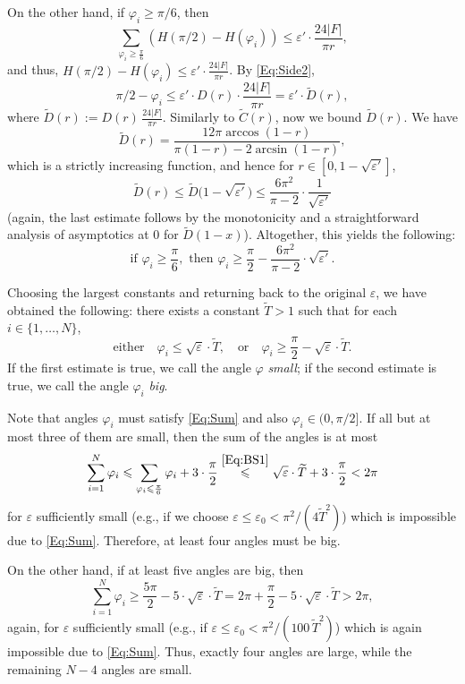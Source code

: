 \documentclass[11pt, oneside]{amsart}
\renewcommand{\tilde}{\widetilde}
\renewcommand{\phi}{\varphi}
\newcommand{\eps}{\varepsilon}
\renewcommand{\ge}{\geqslant}
\renewcommand{\le}{\leqslant}
\theoremstyle{theorem}
\theoremstyle{Intro}
\theoremstyle{definition}
\theoremstyle{remark}
\theoremstyle{claim}
\numberwithin{equation}{section}
\begin{document}
On the other hand, if $\phi_i \ge \pi/6$, then 
\[
\sum_{\phi_i \ge \frac{\pi}6}  (H(\pi/2) - H(\phi_i)) \le \eps' \cdot \frac{24 |F|}{\pi r},
\]
and thus, $H(\pi/2) - H(\phi_i) \le \eps' \cdot \frac{24 |F|}{\pi r}$. By \eqref{Eq:Side2},
\[
\pi/2 - \phi_i \le \eps' \cdot D(r) \cdot \frac{24 |F|}{\pi r} = \eps' \cdot \tilde D(r), 
\]
where $ \tilde D(r) := D(r) \, \frac{24 |F|}{\pi r}$. Similarly to $\tilde C(r)$, now we bound $\tilde D(r)$. We have
\[
\tilde D(r) = \frac{12\pi \arccos(1-r)}{\pi(1 - r) - 2\arcsin(1-r)},
\]
which is a strictly increasing function, and hence for $r \in [0, 1-\sqrt{\eps'}]$,
\[
\tilde D(r) \le \tilde D\big(1-\sqrt{\eps'}\big) \le \frac{6\pi^2}{\pi - 2} \cdot \frac{1}{\sqrt{\eps'}}
\]
(again, the last estimate follows by the monotonicity and a straightforward analysis of asymptotics at $0$ for $\tilde D(1-x)$). Altogether, this yields the following:
\begin{equation}
\label{Eq:BS2}
\text{if }\phi_i \ge \frac{\pi}{6}, \text{ then }\phi_i \ge \frac{\pi}{2} - \frac{6\pi^2}{\pi - 2} \cdot \sqrt{\eps'}.
\end{equation}

Choosing the largest constants and returning back to the original $\eps$, we have obtained the following: there exists a constant $\tilde T > 1$ such that for each $i \in \{1, \ldots, N\}$,
\[
\text{either}\quad \phi_i \le \sqrt{\eps} \cdot \tilde T, \quad \text{or} \quad\phi_i \ge \frac{\pi}{2} - \sqrt{\eps} \cdot \tilde T.
\]
If the first estimate is true, we call the angle $\phi$ \emph{small}; if the second estimate is true, we call the angle $\phi_i$ \emph{big}.


Note that angles $\phi_i$ must satisfy \eqref{Eq:Sum} and also $\phi_i \in (0, \pi/2]$. If all but at most three of them are small, then the sum of the angles is at most
\[
\sum_{i=1}^N \phi_i \le \sum_{\phi_i \le \frac{\pi}6} \phi_i + 3 \cdot \frac{\pi}{2} \overset{\eqref{Eq:BS1}}{\le}  \sqrt{\eps} \cdot \tilde T + 3 \cdot \frac{\pi}{2} < 2\pi
\]
for $\eps$ sufficiently small (e.g., if we choose $\eps \le \eps_0 < \pi^2/ (4 \tilde T^2)$) which is impossible due to \eqref{Eq:Sum}. Therefore, at least four angles must be big.  

On the other hand, if at least five angles are big, then
\[
\sum_{i=1}^N \phi_i \ge \frac{5\pi}{2} - 5 \cdot \sqrt{\eps} \cdot \tilde T = 2\pi + \frac{\pi}{2} - 5 \cdot \sqrt{\eps} \cdot \tilde T> 2\pi,
\]
again, for $\eps$ sufficiently small (e.g., if $\eps \le \eps_0 < \pi^2 / (100 \,\tilde T^2)$) which is again impossible due to \eqref{Eq:Sum}. Thus, exactly four angles are large, while the remaining $N-4$ angles are small.
\end{document}
